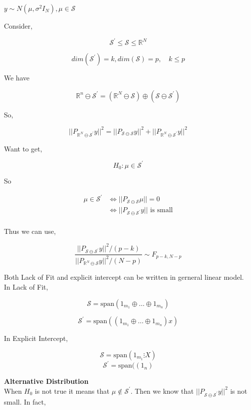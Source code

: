 \documentclass[11pt,fleqn]{book} %
\begin{document}
$y \sim N(\mu, \sigma^2 I_N), \mu \in \mathcal{S}$

Consider, 

$$\mathcal{S}^\prime \leq \mathcal{S} \leq \mathbb{R}^N$$


$$dim(\mathcal{S}^\prime) = k, dim(\mathcal{S}) = p, \quad k \leq p $$


We have 

$$ \mathbb{R}^n \ominus \mathcal{S}^\prime = (\mathbb{R}^N \ominus \mathcal{S}) \oplus (\mathcal{S \ominus \mathcal{S}^\prime}) $$

So,  

$$||P_{\mathbb{R}^N \ominus \mathcal{S}^\prime}y ||^2 = || P_{\mathcal{S} \ominus \mathcal{S}}y||^2 + ||P_{\mathbb{R}^N \ominus \mathcal{S}^\prime}y ||^2 $$

Want to get, 

$$H_0: \mu \in \mathcal{S}^\prime $$

So 

\begin{align*}
	\mu \in \mathcal{S}^\prime &\Leftrightarrow ||P_{\mathcal{S} \ominus \mathcal{S}}\mu || = 0\\
		&\Leftrightarrow ||P_{\mathcal{S} \ominus \mathcal{S}^\prime}y || \text{ is small}\\
\end{align*}

Thus we can use,

$$\frac{||P_{\mathcal{S} \ominus \mathcal{S}^\prime}y ||^2 / (p - k)}{||P_{\mathbb{R}^N \ominus \mathcal{S}}y ||^2 / (N-p)} \sim F_{p-k, N-p} $$

Both Lack of Fit and explicit intercept can be written in gerneral linear model.\\

In Lack of Fit, 

$$\mathcal{S} = \text{span}(1_{m_1} \oplus \dots \oplus  1_{m_n}) $$ 

$$\mathcal{S}^\prime = \text{span}((1_{m_1} \oplus \dots \oplus  1_{m_n}) x) $$

In Explicit Intercept, 

$$\mathcal{S} = \text{span}(1_{m_1} \vdots X) $$
$$\mathcal{S}^\prime = \text{span}((1_{n}) $$

\textbf{Alternative Distribution}\\

When $H_0$ is not true it means that $\mu \notin \mathcal{S}^\prime$. Then we know that $|| P_{\mathcal{S} \ominus \mathcal{S}^\prime}y||^2$ is not small. In fact, 
\end{document}
